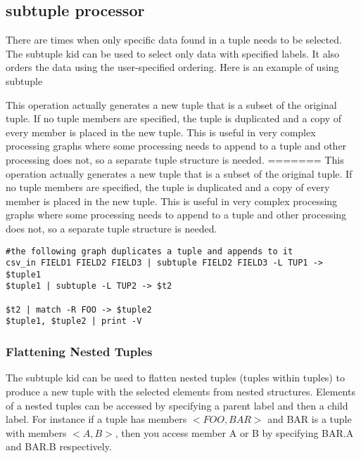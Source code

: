 \documentclass[11pt]{article}
\begin{document}
\subsection{subtuple processor}
There are times when only specific data found in a tuple needs to be selected.  The subtuple kid can
be used to select only data with specified labels.  It also orders the data using the user-specified
ordering.  Here is an example of using subtuple

This operation actually generates a new tuple that is a subset of the
original tuple.  If no tuple members are specified, the tuple is
duplicated and a copy of every member is placed in the new tuple.
This is useful in very complex processing graphs where some processing
needs to append to a tuple and other processing does not, so a
separate tuple structure is needed.
=======
This operation actually generates a new tuple that is a subset of the 
original tuple. If no tuple members are specified, the tuple is 
duplicated and a copy of every member is placed in the new tuple.  
This is useful in very complex processing graphs where some processing 
needs to append to a tuple and other processing does not, 
so a separate tuple structure is needed.

\begin{lstlisting}
#the following graph duplicates a tuple and appends to it
csv_in FIELD1 FIELD2 FIELD3 | subtuple FIELD2 FIELD3 -L TUP1 -> $tuple1
$tuple1 | subtuple -L TUP2 -> $t2

$t2 | match -R FOO -> $tuple2
$tuple1, $tuple2 | print -V
\end{lstlisting}

\subsubsection{Flattening Nested Tuples}
The subtuple kid can be used to flatten nested tuples (tuples within tuples) to produce a new tuple
with the selected elements from nested structures.  Elements of a nested tuples can be accessed by
specifying a parent label and then a child label.  For instance if a tuple has members $<FOO, BAR>$
and BAR is a tuple with members $<A, B>$, then you access member A or B by specifying BAR.A and
BAR.B respectively.
\end{document}
